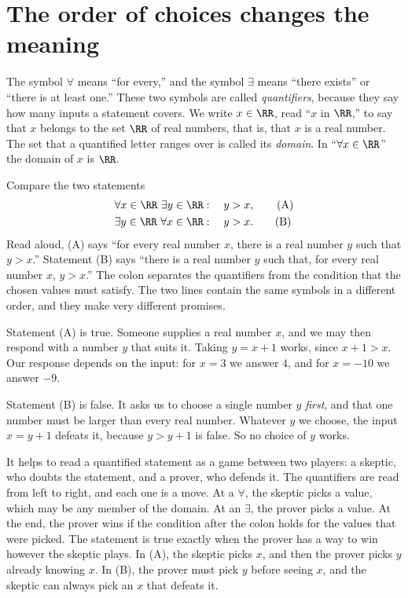 \section{The order of choices changes the meaning}\label{ch02:sec:quantifiers}
The symbol $\forall$ means ``for every,'' and the symbol $\exists$ means ``there exists'' or ``there is at least one.'' These two symbols are called \emph{quantifiers}, because they say how many inputs a statement covers. We write $x\in\RR$, read ``$x$ in $\RR$,'' to say that $x$ belongs to the set $\RR$ of real numbers, that is, that $x$ is a real number. The set that a quantified letter ranges over is called its \emph{domain}. In ``$\forall x\in\RR$'' the domain of $x$ is $\RR$.

Compare the two statements
\begin{align*}
&\forall x\in\RR\ \exists y\in\RR:\quad y>x,\tag{A}\\
&\exists y\in\RR\ \forall x\in\RR:\quad y>x.\tag{B}
\end{align*}
Read aloud, (A) says ``for every real number $x$, there is a real number $y$ such that $y>x$.'' Statement (B) says ``there is a real number $y$ such that, for every real number $x$, $y>x$.'' The colon separates the quantifiers from the condition that the chosen values must satisfy. The two lines contain the same symbols in a different order, and they make very different promises.

Statement (A) is true. Someone supplies a real number $x$, and we may then respond with a number $y$ that suits it. Taking $y=x+1$ works, since $x+1>x$. Our response depends on the input: for $x=3$ we answer $4$, and for $x=-10$ we answer $-9$.

Statement (B) is false. It asks us to choose a single number $y$ \emph{first}, and that one number must be larger than every real number. Whatever $y$ we choose, the input $x=y+1$ defeats it, because $y>y+1$ is false. So no choice of $y$ works.

It helps to read a quantified statement as a game between two players: a skeptic, who doubts the statement, and a prover, who defends it. The quantifiers are read from left to right, and each one is a move. At a $\forall$, the skeptic picks a value, which may be any member of the domain. At an $\exists$, the prover picks a value. At the end, the prover wins if the condition after the colon holds for the values that were picked. The statement is true exactly when the prover has a way to win however the skeptic plays. In (A), the skeptic picks $x$, and then the prover picks $y$ already knowing $x$. In (B), the prover must pick $y$ before seeing $x$, and the skeptic can always pick an $x$ that defeats it.

